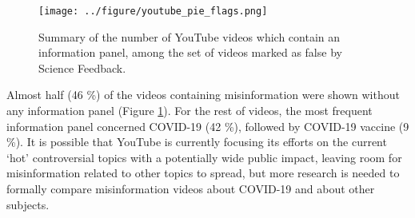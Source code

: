 \documentclass{article}
\begin{document}

\begin{figure}[h]
	\centering
		\texttt{[image: ../figure/youtube\_pie\_flags.png]}
		\caption{Summary of the number of YouTube videos which contain an information panel, among the set of videos marked as false by Science Feedback.}
\label{youtube_panel_proportions}
\end{figure}

\smallskip

Almost half (46 \%) of the videos containing misinformation were shown without any information panel (Figure \ref{youtube_panel_proportions}).
For the rest of videos, the most frequent information panel concerned COVID-19 (42 \%), followed by COVID-19 vaccine (9 \%).
It is possible that YouTube is currently focusing its efforts on the current `hot' controversial topics with a potentially wide public impact, leaving room for misinformation related to other topics to spread, but more research is needed to formally compare misinformation videos about COVID-19 and about other subjects.
\end{document}
